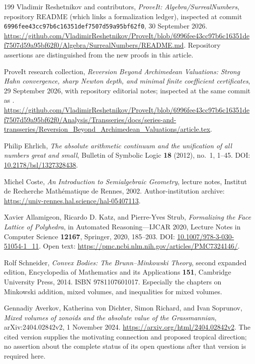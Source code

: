 \documentclass[11pt,a4paper]{article}
\numberwithin{equation}{section}
\theoremstyle{plain}
\newcommand{\pathcode}[1]{\nolinkurl{#1}}
\newcounter{polybibc}
\newenvironment{polybiblist}[1]{\let\section\subsection\renewcommand{\refname}{#1}%
 \begin{thebibliography}{199}\setcounter{enumiv}{\value{polybibc}}}%
 {\setcounter{polybibc}{\value{enumiv}}\end{thebibliography}}
\begin{document}
\begin{polybiblist}{Part III (manuscript 06)}
\small
{}
Vladimir Reshetnikov and contributors,
\emph{ProveIt: Algebra/SurrealNumbers}, repository README (which links a
formalization ledger), inspected at commit
\pathcode{6996fee43cc97b6c16351def7507d59a95bf62f0}, 30 September 2026.
\url{https://github.com/VladimirReshetnikov/ProveIt/blob/6996fee43cc97b6c16351def7507d59a95bf62f0/Algebra/SurrealNumbers/README.md}.
Repository assertions are distinguished from the new proofs in this article.

ProveIt research collection,
\emph{Reversion Beyond Archimedean Valuations: Strong Hahn convergence,
sharp Newton depth, and minimal finite coefficient certificates},
29 September 2026, with repository editorial notes; inspected at the same
commit as \cite{mv:RepoSurreal}.
\url{https://github.com/VladimirReshetnikov/ProveIt/blob/6996fee43cc97b6c16351def7507d59a95bf62f0/Analysis/Transseries/docs/series-and-transseries/Reversion_Beyond_Archimedean_Valuations/article.tex}.

Philip Ehrlich,
\emph{The absolute arithmetic continuum and the unification of all numbers
great and small}, Bulletin of Symbolic Logic \textbf{18} (2012), no.~1,
1--45. DOI: \href{https://doi.org/10.2178/bsl/1327328438}{10.2178/bsl/1327328438}.

Michel Coste,
\emph{An Introduction to Semialgebraic Geometry}, lecture notes,
Institut de Recherche Math\'ematique de Rennes, 2002.
Author-institution archive:
\url{https://univ-rennes.hal.science/hal-05407113}.

Xavier Allamigeon, Ricardo D. Katz, and Pierre-Yves Strub,
\emph{Formalizing the Face Lattice of Polyhedra}, in
Automated Reasoning---IJCAR 2020, Lecture Notes in Computer Science
\textbf{12167}, Springer, 2020, 185--203.
DOI: \href{https://doi.org/10.1007/978-3-030-51054-1_11}{10.1007/978-3-030-51054-1\_11}.
Open text: \url{https://pmc.ncbi.nlm.nih.gov/articles/PMC7324146/}.

Rolf Schneider,
\emph{Convex Bodies: The Brunn--Minkowski Theory}, second expanded edition,
Encyclopedia of Mathematics and its Applications \textbf{151},
Cambridge University Press, 2014. ISBN 9781107601017.
Especially the chapters on Minkowski addition, mixed volumes, and
inequalities for mixed volumes.

Gennadiy Averkov, Katherina von Dichter, Simon Richard, and Ivan Soprunov,
\emph{Mixed volumes of zonoids and the absolute value of the Grassmannian},
arXiv:2404.02842v2, 1 November 2024.
\url{https://arxiv.org/html/2404.02842v2}.
The cited version supplies the motivating connection and proposed
tropical direction; no assertion about the complete status of its open
questions after that version is required here.


\end{polybiblist}
\end{document}
